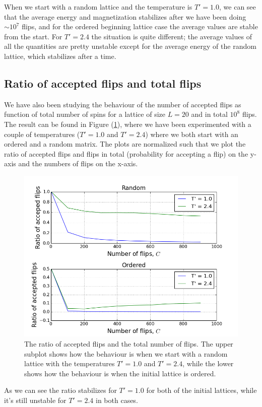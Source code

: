 \documentclass[norsk,a4paper,12pt]{article}
\begin{document}
When we start with a random lattice and the temperature is $T'=1.0$, we can see that the average energy and magnetization stabilizes after we have been doing $\sim 10^7$ flips, and for the ordered beginning lattice case the average values are stable from the start. For $T'=2.4$ the situation is quite different; the average values of all the quantities are pretty unstable except for the average energy of the random lattice, which stabilizes after a time. 

\subsection{Ratio of accepted flips and total flips}
We have also been studying the behaviour of the number of accepted flips as function of total number of spins for a lattice of size $L=20$ and in total $10^8$ flips. The result can be found in Figure (\ref{4c_accept}), where we have been experimented with a couple of temperatures ($T'=1.0$ and $T'=2.4$) where we both start with an ordered and a random matrix. The plots are normalized such that we plot the ratio of accepted flips and flips in total (probability for accepting a flip) on the y-axis and the numbers of flips on the x-axis.  
\begin{figure}[H]
\centering
\includegraphics[width=150mm]{accept_vs_MCc_newnew.png}
\caption{The ratio of accepted flips and the total number of flips. The upper subplot shows how the behaviour is when we start with a random lattice with the temperatures $T'=1.0$ and $T'=2.4$, while the lower shows how the behaviour is when the initial lattice is ordered. \label{4c_accept}}
\end{figure}
As we can see the ratio stabilizes for $T'=1.0$ for both of the initial lattices, while it's still unstable for $T'=2.4$ in both cases. 
\end{document}
